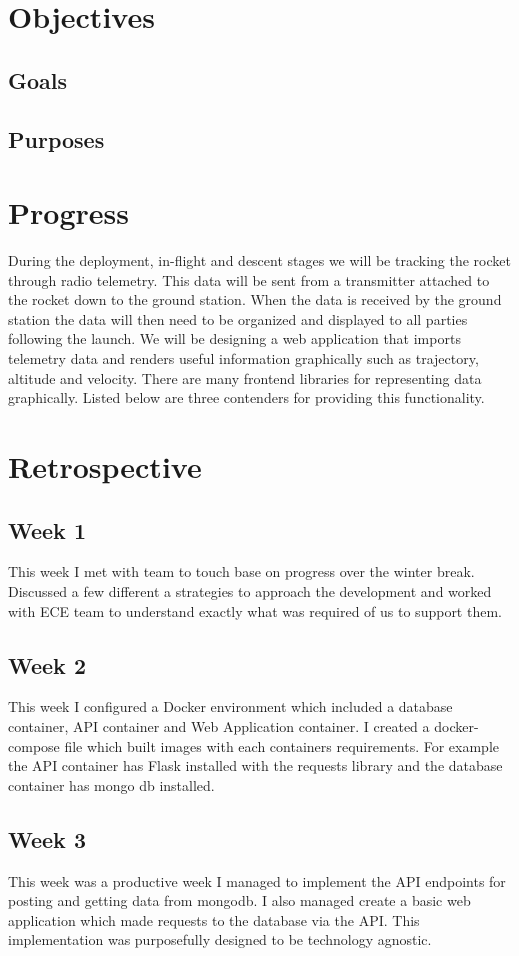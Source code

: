 \documentclass[onecolumn, draftclsnofoot,10pt, compsoc]{IEEEtran}
\begin{document}
\section{Objectives}
\subsection{Goals}
\subsection{Purposes}


\section{Progress}
During the deployment, in-flight and descent stages we will be tracking the rocket through radio telemetry. This data will be sent from a transmitter attached to the rocket down to the ground station. When the data is received by the ground station the data will then need to be organized and displayed to all parties following the launch. We will be designing a web application that imports telemetry data and renders useful information graphically such as trajectory, altitude and velocity. There are many frontend libraries for representing data graphically. Listed below are three contenders for providing this functionality. 


\section{Retrospective}
\subsection{Week 1}
This week I met with team to touch base on progress over the winter break. Discussed a few different a strategies to approach the development and worked with ECE team to understand exactly what was required of us to support them. 
\subsection{Week 2}
This week I configured a Docker environment which included a database container, API container and Web Application container. I created a docker-compose file which built images with each containers requirements. For example the API container has Flask installed with the requests library and the database container has mongo db installed.
\subsection{Week 3}
This week was a productive week I managed to implement the API endpoints for posting and getting data from mongodb. I also managed create a basic web application which made requests to the database via the API. This implementation was purposefully designed to be technology agnostic.  
\end{document}
